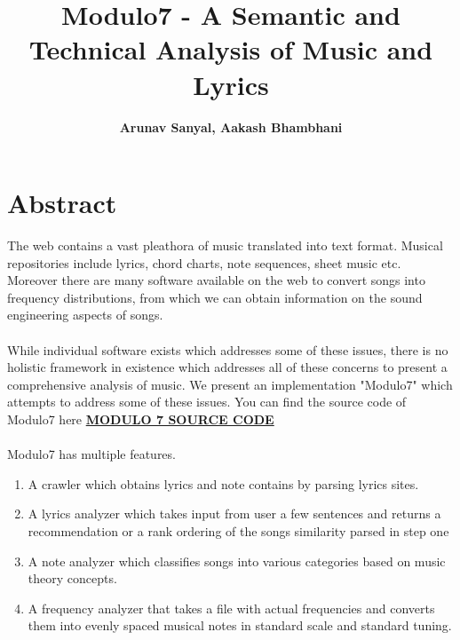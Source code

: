 \documentclass[letterpaper, 11pt]{article}
\begin{document}
\title{Modulo7 - A Semantic and Technical Analysis of Music and Lyrics
\\} 
\author{\textbf{Arunav Sanyal, Aakash Bhambhani}}
\maketitle

\section*{Abstract}
The web contains a vast pleathora of music translated into text format. Musical repositories include lyrics, chord charts, note sequences, sheet music etc. Moreover there are many software available on the web to convert songs into frequency distributions, from which we can obtain information on the sound engineering aspects of songs.\\\\
While individual software exists which addresses some of these issues, there is no holistic framework in existence which addresses all of these concerns to present a comprehensive analysis of music. We present an implementation "Modulo7" which attempts to address some of these issues. You can find the source code of Modulo7 here \href{https://github.com/Khalian/Modulo7}{\textbf{MODULO 7 SOURCE CODE}}
 \\\\
Modulo7 has multiple features. 
\begin{enumerate}
\item A crawler which obtains lyrics and note contains by parsing lyrics sites.
\item A lyrics analyzer which takes input from user a few sentences and returns a recommendation or a rank ordering of the songs similarity parsed in step one 
\item A note analyzer which classifies songs into various categories based on music theory concepts.
\item A frequency analyzer that takes a file with actual frequencies and converts them into evenly spaced musical notes in standard scale and standard tuning.
\end{enumerate} 
\end{document}
